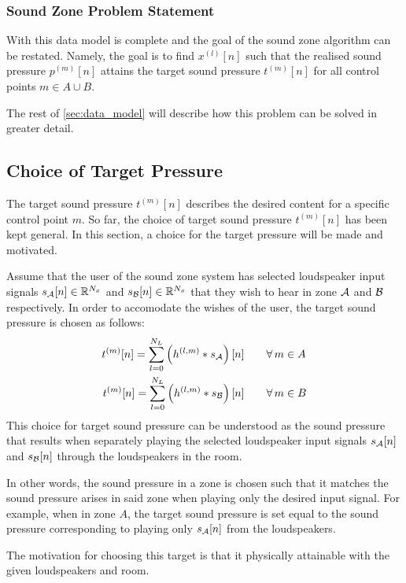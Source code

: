 \subsubsection{Sound Zone Problem Statement}
With this data model is complete and the goal of the sound zone algorithm can be restated.
Namely, the goal is to find $x^{(l)}[n]$ such that the realised sound pressure $p^{(m)}[n]$ attains the
target sound pressure $t^{(m)}[n]$ for all control points $m\in A \cup B$.

The rest of \autoref{sec:data_model} will describe how this problem can be solved in greater detail.

\subsection{Choice of Target Pressure}
\label{sec:data_model:target_pressure_choice}
The target sound pressure $t^{(m)}[n]$ describes the desired content for a specific control point $m$. 
So far, the choice of target sound pressure $t^{(m)}[n]$ has been kept general. 
In this section, a choice for the target pressure will be made and motivated.

Assume that the user of the sound zone system has selected loudspeaker input signals $s_{\mathcal{A}}[n]\in\mathbb{R}^{N_x}$ and
$s_{\mathcal{B}}[n]\in\mathbb{R}^{N_x}$ that they wish to hear in zone $\mathcal{A}$ and $\mathcal{B}$ respectively.
In order to accomodate the wishes of the user, the target sound pressure is chosen as follows: 
\begin{align}
    t^{(m)}[n] = \sum_{l=0}^{N_L} \left(h^{(l,m)} \ast s_{\mathcal{A}}\right)[n]\qquad &\forall\,m\in A\\
    t^{(m)}[n] = \sum_{l=0}^{N_L} \left(h^{(l,m)} \ast s_{\mathcal{B}}\right)[n]\qquad &\forall\,m\in B
\end{align}
This choice for target sound pressure can be understood as the sound pressure that results when separately playing the
selected loudspeaker input signals $s_{\mathcal{A}}[n]$ and $s_{\mathcal{B}}[n]$ through the loudspeakers in the room.

In other words, the sound pressure in a zone is chosen such that it matches the sound pressure arises in said zone when playing only the desired input signal. 
For example, when in zone $A$, the target sound pressure is set equal to the sound pressure corresponding to playing only $s_{\mathcal{A}}[n]$ from the loudspeakers.

The motivation for choosing this target is that it physically attainable with the given loudspeakers and room.



